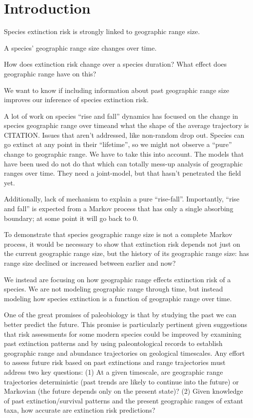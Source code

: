 \documentclass[12pt,letterpaper]{article}
\begin{document}
\section{Introduction}

Species extinction risk is strongly linked to geographic range size.

A species' geographic range size changes over time.

How does extinction risk change over a species duration? What effect does geographic range have on this?

We want to know if including information about past geographic range size improves our inference of species extinction risk.


A lot of work on species ``rise and fall'' dynamics has focused on the change in species geographic range over timeand what the shape of the average trajectory is CITATION. Issues that aren't addressed, like non-random drop out. Species can go extinct at any point in their ``lifetime'', so we might not observe a ``pure'' change to geographic range. We have to take this into account. The models that have been used do not do that which can totally mess-up analysis of geographic ranges over time. They need a joint-model, but that hasn't penetrated the field yet.

Additionally, lack of mechanism to explain a pure ``rise-fall''. Importantly, ``rise and fall'' is expected from a Markov process that has only a single absorbing boundary; at some point it will go back to 0. 

To demonstrate that species geographic range size is not a complete Markov process, it would be necessary to show that extinction risk depends not just on the current geographic range size, but the history of its geographic range size: has range size declined or increased between earlier and now?


We instead are focusing on how geographic range effects extinction risk of a species. We are not modeling geographic range through time, but instead modeling how species extinction is a function of geographic range over time. 




One of the great promises of paleobiology is that by studying the past we can better predict the future.  This promise is particularly pertinent given suggestions that risk assessments for some modern species could be improved by examining past extinction patterns and by using paleontological records to establish geographic range and abundance trajectories on geological timescales.  Any effort to assess future risk based on past extinctions and range trajectories must address two key questions:  (1) At a given timescale, are geographic range trajectories deterministic (past trends are likely to continue into the future) or Markovian (the future depends only on the present state)? (2) Given knowledge of past extinction/survival patterns and the present geographic ranges of extant taxa, how accurate are extinction risk predictions?  
\end{document}
